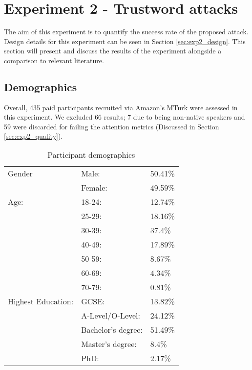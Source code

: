 

\newpage

\section{Experiment 2 - Trustword attacks}
\label{sec:exp2}
The aim of this experiment is to quantify the success rate of the proposed attack. Design details for this experiment can be seen in Section \ref{sec:exp2_design}. This section will present and discuss the results of the experiment alongside a comparison to relevant literature.

\subsection*{Demographics}
Overall, 435 paid participants recruited via Amazon's MTurk were assessed in this experiment. We excluded 66 results; 7 due to being non-native speakers and 59 were discarded for failing the attention metrics (Discussed in Section \ref{sec:exp2_quality}).

\begin{table}[h]
    \centering
    \begin{tabular}{|l|ll|}
        \hline
        Gender & Male: & 50.41\% \\
               & Female: & 49.59\% \\
        \hline
        Age:   & 18-24: & 12.74\% \\ 
               & 25-29: & 18.16\% \\ 
               & 30-39: & 37.4\% \\ 
               & 40-49: & 17.89\% \\ 
               & 50-59: & 8.67\% \\ 
               & 60-69: & 4.34\% \\ 
               & 70-79: & 0.81\% \\ 

        \hline
        Highest Education:  
        & GCSE:                 & 13.82\%  \\
        & A-Level/O-Level:      & 24.12\% \\
        & Bachelor's degree:    & 51.49\% \\
        & Master's degree:      & 8.4\% \\ 
        & PhD:                  & 2.17\% \\
        \hline

    \end{tabular}
    \caption{Participant demographics}
    \label{tab:exp2_demo}
\end{table}

